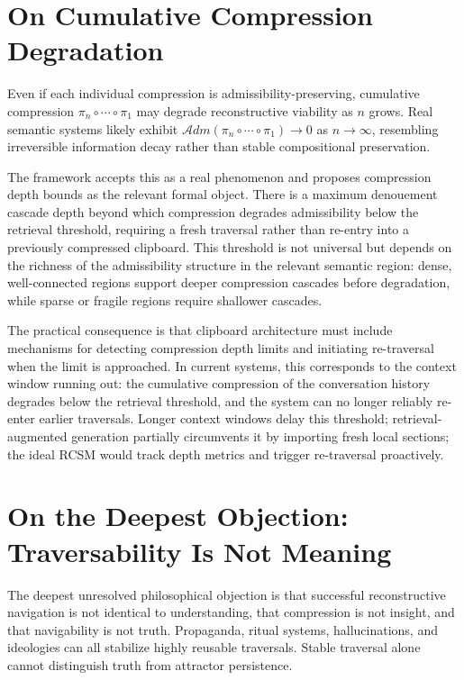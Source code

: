 \documentclass[12pt,oneside]{book}
\theoremstyle{plain}
\theoremstyle{definition}
\theoremstyle{plain}
\begin{document}
\section{On Cumulative Compression Degradation}

Even if each individual compression is admissibility-preserving, cumulative compression $\pi_n \circ \cdots \circ \pi_1$ may degrade reconstructive viability as $n$ grows. Real semantic systems likely exhibit $\mathcal{A}dm(\pi_n \circ \cdots \circ \pi_1) \to 0$ as $n \to \infty$, resembling irreversible information decay rather than stable compositional preservation.

The framework accepts this as a real phenomenon and proposes compression depth bounds as the relevant formal object. There is a maximum denouement cascade depth beyond which compression degrades admissibility below the retrieval threshold, requiring a fresh traversal rather than re-entry into a previously compressed clipboard. This threshold is not universal but depends on the richness of the admissibility structure in the relevant semantic region: dense, well-connected regions support deeper compression cascades before degradation, while sparse or fragile regions require shallower cascades.

The practical consequence is that clipboard architecture must include mechanisms for detecting compression depth limits and initiating re-traversal when the limit is approached. In current systems, this corresponds to the context window running out: the cumulative compression of the conversation history degrades below the retrieval threshold, and the system can no longer reliably re-enter earlier traversals. Longer context windows delay this threshold; retrieval-augmented generation partially circumvents it by importing fresh local sections; the ideal RCSM would track depth metrics and trigger re-traversal proactively.

\section{On the Deepest Objection: Traversability Is Not Meaning}

The deepest unresolved philosophical objection is that successful reconstructive navigation is not identical to understanding, that compression is not insight, and that navigability is not truth. Propaganda, ritual systems, hallucinations, and ideologies can all stabilize highly reusable traversals. Stable traversal alone cannot distinguish truth from attractor persistence.
\end{document}
